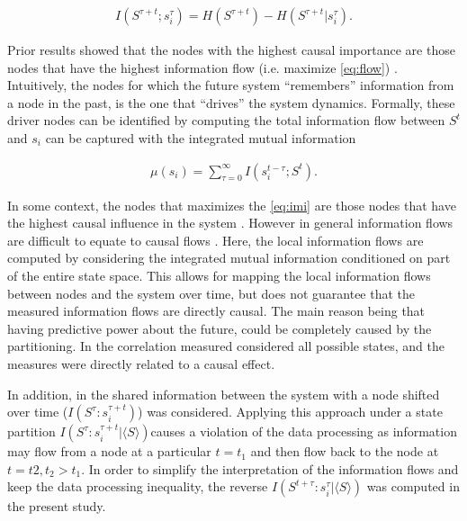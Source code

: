 \documentclass[a4paper, 11pt, twocolumn]{article}
\begin{document}
\begin{equation}
\label{eq:flow}
\begin{split}
I(S^{\tau + t}; s_i^{\tau}) = H(S^{\tau + t}) - H(S^{\tau + t} | s_i^{\tau}).
\end{split}
\end{equation}

Prior results showed that the  nodes with the highest causal
importance are those nodes that have the highest information
flow    (i.e.    maximize   \ref{eq:flow})    \cite{vanElteren2022}.
Intuitively,  the   nodes  for   which  the   future  system
``remembers'' information from a node  in the past, is the one
that ``drives''  the system  dynamics. Formally,  these driver
nodes can  be identified by computing  the total information
flow between  \(S^t\) and \(s_i\)  can be captured  with the
integrated mutual information \cite{vanElteren2022}

\begin{equation}
\label{eq:imi}
\begin{split}
\mu(s_i) = \sum_{\tau = 0}^{\infty} I(s_{i}^{t-\tau} ; S^t).
\end{split}
\end{equation}

In some  context, the nodes that  maximizes the \eqref{eq:imi}
are those  nodes that have  the highest causal  influence in
the   system   \cite{vanElteren2022}.   However   in   general
information flows  are difficult  to equate to  causal flows
\cite{Lizier2013,James2016}. Here, the local information flows
are   computed   by   considering  the   integrated   mutual
information conditioned  on part of the  entire state space.
This allows for mapping  the local information flows between
nodes and the system over  time, but does not guarantee that
the measured information flows are directly causal. The main
reason being that having  predictive power about the future,
could  be   completely  caused   by  the   partitioning.  In
\cite{vanElteren2022} the correlation  measured considered all
possible states, and the measures were directly related to a
causal  effect.

In addition,  in \cite{vanElteren2022} the  shared information
between   the  system   with  a   node  shifted   over  time
(\(I(S^{\tau} :  s_i^{\tau + t})\)) was  considered. Applying this
approach under a state partition \(I(S^{\tau} : s_i^{\tau + t} | \langle
S  \rangle)\)causes   a  violation  of  the   data  processing  as
information may flow  from a node at a particular  \(t = t_1\)
and then flow  back to the node  at \(t = t2, t_2  > t_1\). In
order  to simplify  the  interpretation  of the  information
flows and  keep the data processing  inequality, the reverse
\(I(S^{t  + \tau}  : s_i^{\tau}  | \langle  S \rangle)\)  was computed  in the
present study.
\end{document}
